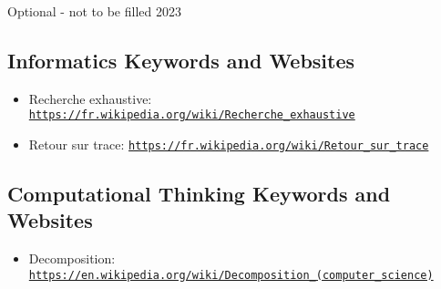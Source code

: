 \documentclass[a4paper,11pt]{report}
\newcommand{\BrochureUrlText}[1]{\texttt{#1}}
\begin{document}
Optional - not to be filled 2023


\subsection*{Informatics Keywords and Websites}

\begin{itemize}
  \item Recherche exhaustive: \href{https://fr.wikipedia.org/wiki/Recherche_exhaustive}{\BrochureUrlText{https://fr.wikipedia.org/wiki/Recherche\_exhaustive}}
  \item Retour sur trace: \href{https://fr.wikipedia.org/wiki/Retour_sur_trace}{\BrochureUrlText{https://fr.wikipedia.org/wiki/Retour\_sur\_trace}}
\end{itemize}


\subsection*{Computational Thinking Keywords and Websites}

\begin{itemize}
  \item Decomposition: \href{https://en.wikipedia.org/wiki/Decomposition_(computer_science)}{\BrochureUrlText{https://en.wikipedia.org/wiki/Decomposition\_(computer\_science)}}
\end{itemize}
\end{document}
